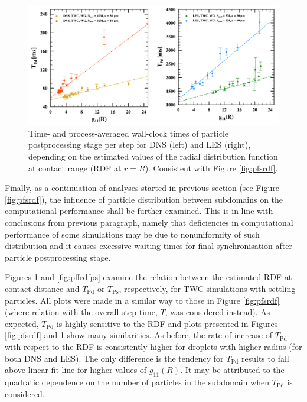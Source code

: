 \documentclass{pracamgren}
\begin{document}
\medskip

\begin{figure}[ht]
\centering
\includegraphics[width=13.5cm]{figures/3-13_pffrdfpd.pdf}
\caption{
Time- and process-averaged wall-clock times of particle postprocessing stage per step for DNS (left) and LES (right), depending on the estimated values of the radial distribution function at contact range (RDF at $r=R$).
Consistent with Figure \ref{fig:pfsrdf}.
}
\label{fig:pffrdfpd}
\end{figure}

Finally, as a continuation of analyses started in previous section (see Figure \ref{fig:pfsrdf}), the influence of particle distribution between subdomains on the computational performance shall be further examined.
This is in line with conclusions from previous paragraph, namely that deficiencies in computational performance of some simulations may be due to nonuniformity of such distribution and it causes excessive waiting times for final synchronisation after particle postprocessing stage.

Figures \ref{fig:pffrdfpd} and \ref{fig:pffrdfps} examine the relation between the estimated RDF at contact distance and $T_{\text{Pd}}$ or $T_{\text{Ps}}$, respectively, for TWC simulations with settling particles.
All plots were made in a similar way to those in Figure \ref{fig:pfsrdf} (where relation with the overall step time, $T$, was considered instead).
As expected,  $T_{\text{Pd}}$ is highly sensitive to the RDF and plots presented in Figures \ref{fig:pfsrdf} and \ref{fig:pffrdfpd} show many similarities.
As before, the rate of increase of $T_{\text{Pd}}$ with respect to the RDF is consistently higher for droplets with higher radius (for both DNS and LES).  
The only difference is the tendency for $T_{\text{Pd}}$ results to fall above linear fit line for higher values of $g_{11}(R)$.
It may be attributed to the quadratic dependence on the number of particles in the subdomain when $T_{\text{Pd}}$ is considered.
\end{document}

